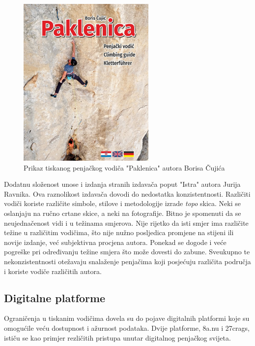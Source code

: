 \begin{figure}[H]
    \centering
    \includegraphics[width=0.6\textwidth]{images/analiza/vodic_paklenica.jpeg}
    \caption{Prikaz tiskanog penjačkog vodiča "Paklenica" autora Borisa Čujića}
\end{figure}

Dodatnu složenost unose i izdanja stranih izdavača poput "Istra" autora Jurija Ravnika. Ova raznolikost izdavača dovodi do nedostatka konzistentnosti. Različiti vodiči koriste različite simbole, stilove i metodologije izrade \textit{topo} skica. Neki se oslanjaju na ručno crtane skice, a neki na fotografije. Bitno je spomenuti da se neujednačenost vidi i u težinama smjerova. Nije rijetko da isti smjer ima različite težine u različitim vodičima, što nije nužno posljedica promjene na stijeni ili novije izdanje, već subjektivna procjena autora. Ponekad se dogode i veće pogreške pri određivanju težine smjera što može dovesti do zabune. Sveukupno te nekonzistentnosti otežavaju snalaženje penjačima koji posjećuju različita područja i koriste vodiče različitih autora. 




\subsection{Digitalne platforme}

Ograničenja u tiskanim vodičima dovela su do pojave digitalnih platformi koje su omogućile veću dostupnost i ažurnost podataka. Dvije platforme, 8a.nu i 27crags, ističu se kao primjer rezličitih pristupa unutar digitalnog penjačkog svijeta. 

